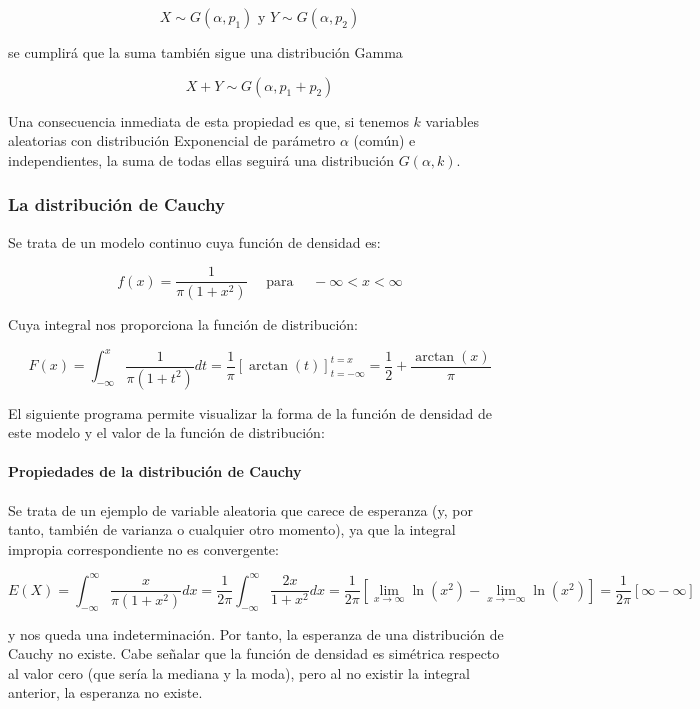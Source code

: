 \documentclass[
]{article}
\begin{document}
\[
X \sim G\left(\alpha, p_{1}\right) \text { y } Y \sim G\left(\alpha, p_{2}\right)
\]

se cumplirá que la suma también sigue una distribución Gamma

\[
X+Y \sim G\left(\alpha, p_{1}+p_{2}\right)
\]

Una consecuencia inmediata de esta propiedad es que, si tenemos \(k\) variables aleatorias con distribución Exponencial de parámetro \(\alpha\) (común) e independientes, la suma de todas ellas seguirá una distribución \(G(\alpha, k)\).

\subsubsection{La distribución de Cauchy}\label{la-distribuciuxf3n-de-cauchy}

Se trata de un modelo continuo cuya función de densidad es:

\[
f(x)=\frac{1}{\pi\left(1+x^{2}\right)} \quad \text { para } \quad-\infty<x<\infty
\]

Cuya integral nos proporciona la función de distribución:

\[
F(x)=\int_{-\infty}^{x} \frac{1}{\pi\left(1+t^{2}\right)} d t=\frac{1}{\pi}[\arctan (t)]_{t=-\infty}^{t=x}=\frac{1}{2}+\frac{\arctan (x)}{\pi}
\]

El siguiente programa permite visualizar la forma de la función de densidad de este modelo y el valor de la función de distribución:

\paragraph{Propiedades de la distribución de Cauchy}\label{propiedades-de-la-distribuciuxf3n-de-cauchy}

Se trata de un ejemplo de variable aleatoria que carece de esperanza (y, por tanto, también de varianza o cualquier otro momento), ya que la integral impropia correspondiente no es convergente:

\[
E(X)=\int_{-\infty}^{\infty} \frac{x}{\pi\left(1+x^{2}\right)} d x=\frac{1}{2 \pi} \int_{-\infty}^{\infty} \frac{2 x}{1+x^{2}} d x=\frac{1}{2 \pi}\left[\lim _{x \rightarrow \infty} \ln \left(x^{2}\right)-\lim _{x \rightarrow-\infty} \ln \left(x^{2}\right)\right]=\frac{1}{2 \pi}[\infty-\infty]
\]

y nos queda una indeterminación. Por tanto, la esperanza de una distribución de Cauchy no existe. Cabe señalar que la función de densidad es simétrica respecto al valor cero (que sería la mediana y la moda), pero al no existir la integral anterior, la esperanza no existe.
\end{document}
